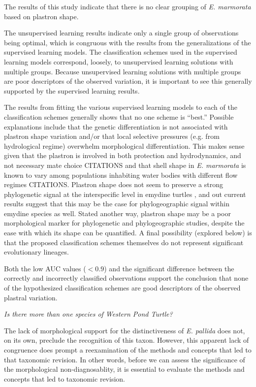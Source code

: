 \documentclass[12pt,letterpaper]{article}
\renewcommand{\subsection}[1]{%
\bigskip
\begin{center}
\begin{large}
\normalfont\itshape #1
\end{large}
\end{center}}
\begin{document}
The results of this study indicate that there is no clear grouping of \textit{E. marmorata} based on plastron shape.

The unsupervised learning results indicate only a single group of observations being optimal, which is congruous with the results from the generalizations of the supervised learning models. The classification schemes used in the supervised learning models correspond, loosely, to unsupervised learning solutions with multiple groups. Because unsupervised learning solutions with multiple groups are poor descriptors of the observed variation, it is important to see this generally supported by the supervised learning results.

The results from fitting the various supervised learning models to each of the classification schemes generally shows that no one scheme is ``best.'' Possible explanations include that the genetic differentiation is not associated with plastron shape variation and/or that local selective pressures (e.g. from hydrological regime) overwhelm morphological differentiation. This makes sense given that the plastron is involved in both protection and hydrodynamics, and not necessary mate choice CITATIONS and that shell shape in \textit{E. marmorata} is known to vary among populations inhabiting water bodies with different flow regimes CITATIONS. Plastron shape does not seem to preserve a strong phylogenetic signal at the interspecific level in emydine turtles \citep{Angielczyk2011}, and out current results suggest that this may be the case for phylogeographic signal within emydine species as well. Stated another way, plastron shape may be a poor morphological marker for phylogenetic and phylogeographic studies, despite the ease with which its shape can be quantified. A final possibility (explored below) is that the proposed classification schemes themselves do not represent significant evolutionary lineages.

Both the low AUC values (\(< 0.9\)) and the significant difference between the correctly and incorrectly classified observations support the conclusion that none of the hypothesized classification schemes are good descriptors of the observed plastral variation.


\subsection{Is there more than one species of Western Pond Turtle?}

The lack of morphological support for the distinctiveness of \textit{E. pallida} does not, on its own, preclude the recognition of this taxon. However, this apparent lack of congruence does prompt a reexamination of the methods and concepts that led to that taxonomic revision. In other words, before we can assess the significance of the morphological non-diagnosablity, it is essential to evaluate the methods and concepts that led to taxonomic revision. 
\end{document}
